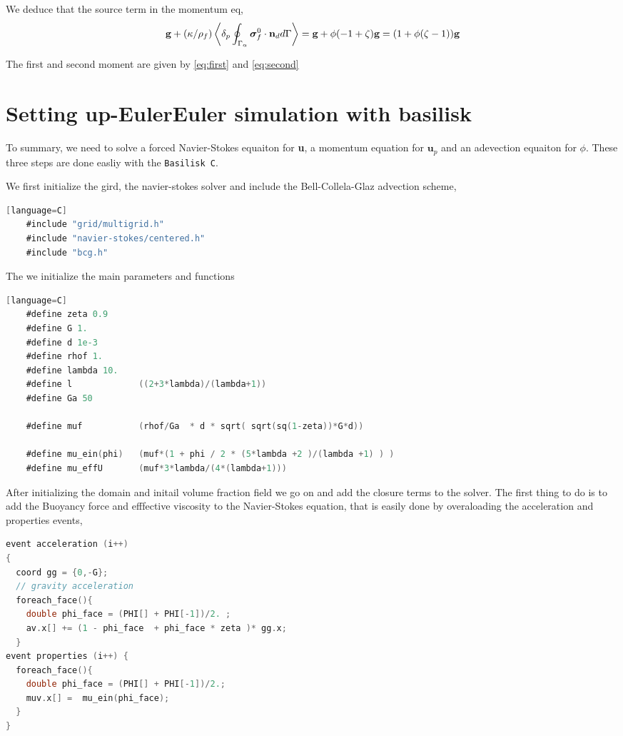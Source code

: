 We deduce that the source term in the momentum eq, 
\begin{equation*}
    \textbf{g} 
    + (\kappa/\rho_f)
    \left<\delta_p \oint_{\Gamma_{\alpha}} {\bm{\sigma}_f^0 \cdot \textbf{n}_d} d\Gamma\right>
    =
    \textbf{g}
    +  
    \phi (- 1 + \zeta)
    \textbf{g}
    = (1 + \phi(\zeta-1) )\textbf{g}
\end{equation*}

The first and second moment are given by \ref{eq:first} and \ref{eq:second}

\section{Setting up-EulerEuler simulation with basilisk}


To summary, we need to solve a forced Navier-Stokes equaiton for \textbf{u}, a momentum equation for $\textbf{u}_p$ and an adevection equaiton for $\phi$. 
These three steps are done easliy with the \texttt{Basilisk C}. 

We first initialize the gird, the navier-stokes solver and include the Bell-Collela-Glaz advection scheme,  
\begin{lstlisting}[language=C][language=C]
    #include "grid/multigrid.h"
    #include "navier-stokes/centered.h"
    #include "bcg.h"
\end{lstlisting}

The we initialize the main parameters and functions 
\begin{lstlisting}[language=C][language=C]
    #define zeta 0.9
    #define G 1. 
    #define d 1e-3
    #define rhof 1. 
    #define lambda 10.
    #define l             ((2+3*lambda)/(lambda+1))
    #define Ga 50

    #define muf           (rhof/Ga  * d * sqrt( sqrt(sq(1-zeta))*G*d))

    #define mu_ein(phi)   (muf*(1 + phi / 2 * (5*lambda +2 )/(lambda +1) ) )
    #define mu_effU       (muf*3*lambda/(4*(lambda+1)))
\end{lstlisting}


After initializing the domain and initail volume fraction field we go on and add the closure terms to the solver. 
The first thing to do is to add the Buoyancy force and efffective viscosity to the Navier-Stokes equation, that is easily done by overaloading the acceleration and properties events,  
\begin{lstlisting}[language=C]
event acceleration (i++)
{
  coord gg = {0,-G};
  // gravity acceleration 
  foreach_face(){
    double phi_face = (PHI[] + PHI[-1])/2. ; 
    av.x[] += (1 - phi_face  + phi_face * zeta )* gg.x; 
  }
event properties (i++) {
  foreach_face(){
    double phi_face = (PHI[] + PHI[-1])/2.;
    muv.x[] =  mu_ein(phi_face);
  }
}
\end{lstlisting}

